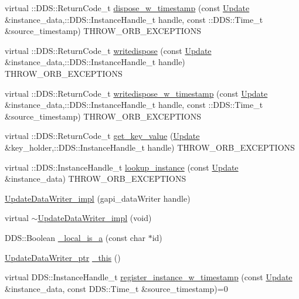 \begin{DoxyCompactItemize}
\item 
virtual ::DDS::ReturnCode\_\-t \hyperlink{classKnowledge_1_1UpdateDataWriter__impl_a9731520130e64a7fa32246e06e4f6011}{dispose\_\-w\_\-timestamp} (const \hyperlink{structKnowledge_1_1Update}{Update} \&instance\_\-data,::DDS::InstanceHandle\_\-t handle, const ::DDS::Time\_\-t \&source\_\-timestamp) THROW\_\-ORB\_\-EXCEPTIONS
\item 
virtual ::DDS::ReturnCode\_\-t \hyperlink{classKnowledge_1_1UpdateDataWriter__impl_aa5e6620b8424cd68391ff194ffb730d8}{writedispose} (const \hyperlink{structKnowledge_1_1Update}{Update} \&instance\_\-data,::DDS::InstanceHandle\_\-t handle) THROW\_\-ORB\_\-EXCEPTIONS
\item 
virtual ::DDS::ReturnCode\_\-t \hyperlink{classKnowledge_1_1UpdateDataWriter__impl_a382b6c9ef3e6c99af75189293d2c2496}{writedispose\_\-w\_\-timestamp} (const \hyperlink{structKnowledge_1_1Update}{Update} \&instance\_\-data,::DDS::InstanceHandle\_\-t handle, const ::DDS::Time\_\-t \&source\_\-timestamp) THROW\_\-ORB\_\-EXCEPTIONS
\item 
virtual ::DDS::ReturnCode\_\-t \hyperlink{classKnowledge_1_1UpdateDataWriter__impl_abecc3230e17599412d577791f81e4d2e}{get\_\-key\_\-value} (\hyperlink{structKnowledge_1_1Update}{Update} \&key\_\-holder,::DDS::InstanceHandle\_\-t handle) THROW\_\-ORB\_\-EXCEPTIONS
\item 
virtual ::DDS::InstanceHandle\_\-t \hyperlink{classKnowledge_1_1UpdateDataWriter__impl_a79ed40b74844e0e3bdb870540f2d054e}{lookup\_\-instance} (const \hyperlink{structKnowledge_1_1Update}{Update} \&instance\_\-data) THROW\_\-ORB\_\-EXCEPTIONS
\item 
\hyperlink{classKnowledge_1_1UpdateDataWriter__impl_a079f78a0225af8aa1ece43144782f996}{UpdateDataWriter\_\-impl} (gapi\_\-dataWriter handle)
\item 
virtual \hyperlink{classKnowledge_1_1UpdateDataWriter__impl_ac805595b98d4ae472fe8d0fbcc7df22a}{$\sim$UpdateDataWriter\_\-impl} (void)
\item 
DDS::Boolean \hyperlink{classKnowledge_1_1UpdateDataWriter_a3b01797fe44cd39c33e73df21533ac0e}{\_\-local\_\-is\_\-a} (const char $\ast$id)
\item 
\hyperlink{classKnowledge_1_1UpdateDataWriter}{UpdateDataWriter\_\-ptr} \hyperlink{classKnowledge_1_1UpdateDataWriter_a6e2dd4be898894882d4939440e1bf1e2}{\_\-this} ()
\item 
virtual DDS::InstanceHandle\_\-t \hyperlink{classKnowledge_1_1UpdateDataWriter_aa7171ccd788c135c7bfb66ddd119168e}{register\_\-instance\_\-w\_\-timestamp} (const \hyperlink{structKnowledge_1_1Update}{Update} \&instance\_\-data, const DDS::Time\_\-t \&source\_\-timestamp)=0

\end{DoxyCompactItemize}
